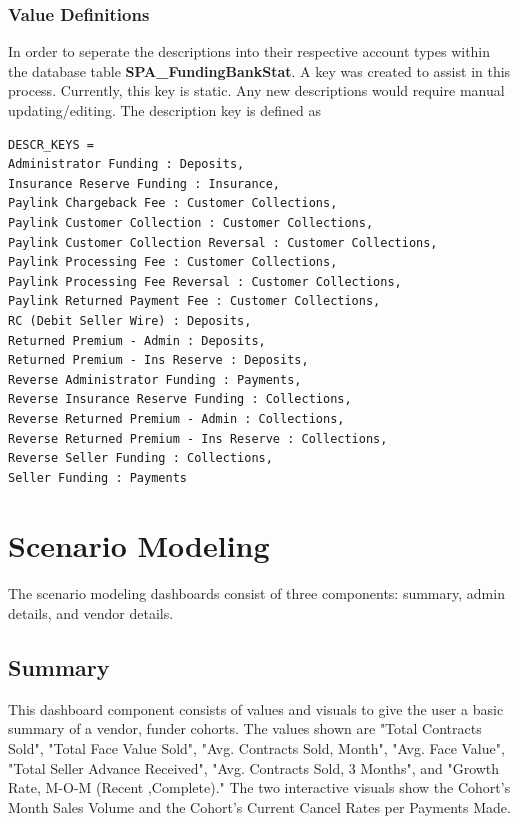 \documentclass[titlepage]{article}
\begin{document}
\subsubsection{Value Definitions}
In order to seperate the descriptions into their respective account types within the database table \textbf{SPA\_FundingBankStat}. A key was created to assist in this process. Currently, this key is static. Any new descriptions would require manual updating/editing. The description key is defined as 
\begin{verbatim}
DESCR_KEYS = 
Administrator Funding : Deposits,
Insurance Reserve Funding : Insurance,
Paylink Chargeback Fee : Customer Collections,
Paylink Customer Collection : Customer Collections,
Paylink Customer Collection Reversal : Customer Collections,
Paylink Processing Fee : Customer Collections,
Paylink Processing Fee Reversal : Customer Collections,
Paylink Returned Payment Fee : Customer Collections,
RC (Debit Seller Wire) : Deposits,
Returned Premium - Admin : Deposits,
Returned Premium - Ins Reserve : Deposits,
Reverse Administrator Funding : Payments,
Reverse Insurance Reserve Funding : Collections,
Reverse Returned Premium - Admin : Collections,
Reverse Returned Premium - Ins Reserve : Collections,
Reverse Seller Funding : Collections,
Seller Funding : Payments
\end{verbatim}

\newpage
\section{Scenario Modeling}
The scenario modeling dashboards consist of three components: summary, admin details, and vendor details. 
\subsection{Summary}
This dashboard component consists of values and visuals to give the user a basic summary of a vendor, funder cohorts. The values shown are "Total Contracts Sold", "Total Face Value Sold", "Avg. Contracts Sold, Month", "Avg. Face Value", "Total Seller Advance Received", "Avg. Contracts Sold, 3 Months", and "Growth Rate, M-O-M (Recent ,Complete)." The two interactive visuals show the Cohort's Month Sales Volume and the Cohort's Current Cancel Rates per Payments Made. 
\end{document}
